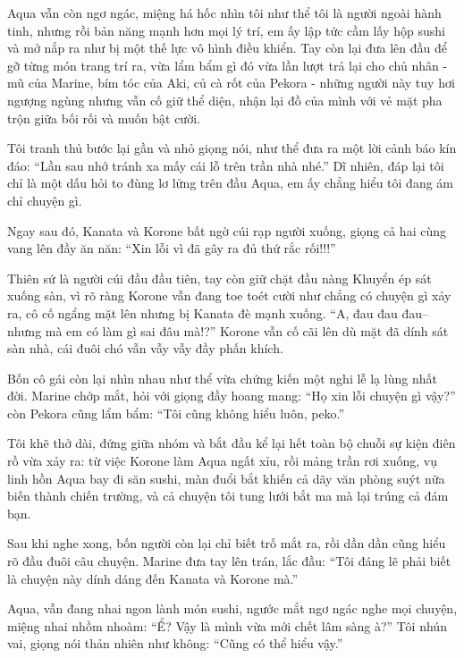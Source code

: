 \documentclass[../main.tex]{subfiles}
\begin{document}
Aqua vẫn còn ngơ ngác, miệng há hốc nhìn tôi như thể tôi là người ngoài hành tinh, nhưng rồi bản năng mạnh hơn mọi lý trí, em ấy lập tức cầm lấy hộp sushi và mở nắp ra như bị một thế lực vô hình điều khiển. Tay còn lại đưa lên đầu để gỡ từng món trang trí ra, vừa lẩm bẩm gì đó vừa lần lượt trả lại cho chủ nhân - mũ của Marine, bím tóc của Aki, củ cà rốt của Pekora - những người này tuy hơi ngượng ngùng nhưng vẫn cố giữ thể diện, nhận lại đồ của mình với vẻ mặt pha trộn giữa bối rối và muốn bật cười.

Tôi tranh thủ bước lại gần và nhỏ giọng nói, như thể đưa ra một lời cảnh báo kín đáo: ``Lần sau nhớ tránh xa mấy cái lỗ trên trần nhà nhé.'' Dĩ nhiên, đáp lại tôi chỉ là một dấu hỏi to đùng lơ lửng trên đầu Aqua, em ấy chẳng hiểu tôi đang ám chỉ chuyện gì.

Ngay sau đó, Kanata và Korone bất ngờ cúi rạp người xuống, giọng cả hai cùng vang lên đầy ăn năn: ``Xin lỗi vì đã gây ra đủ thứ rắc rối!!!''

Thiên sứ là người cúi đầu đầu tiên, tay còn giữ chặt đầu nàng Khuyển ép sát xuống sàn, vì rõ ràng Korone vẫn đang toe toét cười như chẳng có chuyện gì xảy ra, cô cố ngẩng mặt lên nhưng bị Kanata đè mạnh xuống. ``A, đau đau đau-- nhưng mà em có làm gì sai đâu mà!?'' Korone vẫn cố cãi lên dù mặt đã dính sát sàn nhà, cái đuôi chó vẫn vẫy vẫy đầy phấn khích.


Bốn cô gái còn lại nhìn nhau như thể vừa chứng kiến một nghi lễ lạ lùng nhất đời. Marine chớp mắt, hỏi với giọng đầy hoang mang: ``Họ xin lỗi chuyện gì vậy?'' còn Pekora cũng lẩm bẩm: ``Tôi cũng không hiểu luôn, peko.''

Tôi khẽ thở dài, đứng giữa nhóm và bắt đầu kể lại hết toàn bộ chuỗi sự kiện điên rồ vừa xảy ra: từ việc Korone làm Aqua ngất xỉu, rồi mảng trần rơi xuống, vụ linh hồn Aqua bay đi săn sushi, màn đuổi bắt khiến cả dãy văn phòng suýt nữa biến thành chiến trường, và cả chuyện tôi tung lưới bắt ma mà lại trúng cả đám bạn.

Sau khi nghe xong, bốn người còn lại chỉ biết trố mắt ra, rồi dần dần cũng hiểu rõ đầu đuôi câu chuyện. Marine đưa tay lên trán, lắc đầu: ``Tôi đáng lẽ phải biết là chuyện này dính dáng đến Kanata và Korone mà.''

Aqua, vẫn đang nhai ngon lành món sushi, ngước mắt ngơ ngác nghe mọi chuyện, miệng nhai nhồm nhoàm: ``Ể? Vậy là mình vừa mới chết lâm sàng à?'' Tôi nhún vai, giọng nói thản nhiên như không: ``Cũng có thể hiểu vậy.''
\end{document}
